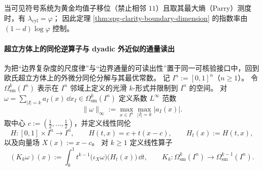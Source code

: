 





\begin{remark}[黄金均值稳定语法的专门化]\label{rem:spg-golden-mean-specialization}
当可见符号系统为黄金均值子移位（禁止相邻 $11$）且取其最大熵（Parry）测度时，有 $\lambda_{\mathrm{cyl}}=\varphi$；
因此定理 \ref{thm:spg-clarity-boundary-dimension} 的指数率由 $(1-d)\log\varphi$ 控制。
\end{remark}

\paragraph{超立方体上的同伦逆算子与 dyadic 外近似的通量读出}
为把“边界复杂度的尺度律”与“边界通量的可读出性”置于同一可核验接口中，回到欧氏超立方体上的外微分同伦分解与其最优常数。
记 \(I^n:=[0,1]^n\)（\(n\ge 1\)）。
令 \(\Omega^k_{\mathrm{sm}}(I^n)\) 表示在 \(I^n\) 邻域上定义的光滑 \(k\)-形式并限制到 \(I^n\) 的空间。
对
\(
\omega=\sum_{|I|=k}a_I(x)\,\dd x_I\in\Omega^k_{\mathrm{sm}}(I^n)
\)
定义系数 \(L^\infty\) 范数
\[
\|\omega\|_\infty:=\max_{x\in I^n}\max_{|I|=k}|a_I(x)|.
\]
取中心 \(c:=(\tfrac12,\dots,\tfrac12)\)，并定义线性同伦
\[
H:[0,1]\times I^n\to I^n,\qquad H(t,x)=c+t(x-c),
\qquad H_t(x):=H(t,x),
\]
以及向量场 \(X(x):=x-c\)。
对 \(k\ge 1\) 定义线性算子
\begin{equation}\label{eq:spg-cube-homotopy-operator-Kk}
(K_k\omega)(x):=\int_0^1 t^{k-1}\bigl(\iota_X\omega\bigr)\bigl(H_t(x)\bigr)\,\dd t,
\qquad
K_k:\Omega^k_{\mathrm{sm}}(I^n)\to\Omega^{k-1}_{\mathrm{sm}}(I^n).
\end{equation}

